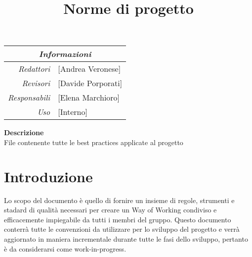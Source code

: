 \documentclass[12pt]{article}
\begin{document}
\graphicspath{ {../templates/img/} }
\setcounter{tocdepth}{4}
\setcounter{secnumdepth}{4}
\title{Norme di progetto}

\firstPage

\pagestyle{genericDocstyle}
\maketitle

\begin{center}
    \begin{tabular}{r | l}
		\multicolumn{2}{c}{\textit{Informazioni}}\\
		\hline
		
			\textit{Redattori} &
			[Andrea Veronese]\makecell{}\\

			\textit{Revisori} &
			[Davide Porporati]\makecell{}\\
			\textit{Responsabili} &
			[Elena Marchioro]\makecell{}\\
		      \textit{Uso} & 
                [Interno]\makecell{}\\
    \end{tabular}
\end{center}

\begin{center}
    \textbf{Descrizione}\\
    File contenente tutte le best practices applicate al progetto 
\end{center}

\pagebreak

\tableofcontents
\pagebreak

\printindex 

\makeversioni
\section{Introduzione}
Lo scopo del documento è quello di fornire un insieme di regole, strumenti e stadard di qualità necessari per creare un Way of Working condiviso e efficacemente impiegabile da tutti i membri del gruppo.
Questo documento conterrà tutte le convenzioni da utilizzare per lo sviluppo del progetto e verrà aggiornato in maniera incrementale durante tutte le fasi dello sviluppo, pertanto è da considerarsi come work-in-progress.
\end{document}

